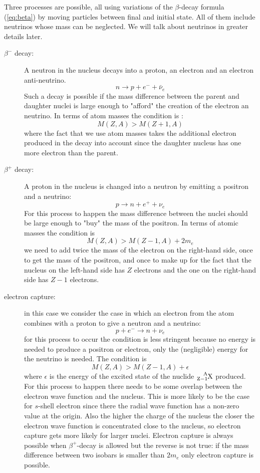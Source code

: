 \documentclass[12pt]{article}
\begin{document}
Three processes are possible, all using variations of the $\beta$-decay formula (\ref{eq:beta}) by moving particles between final and initial state. All of them include neutrinos whose mass can be neglected. We will talk about neutrinos in greater details later.
\begin{description}
\item[$\beta^-$ decay:] A neutron in the nucleus decays into a proton, an  electron and an electron anti-neutrino. 
\[n\rightarrow p+e^-+\bar{\nu}_e\]
Such a decay is possible if the mass difference between the parent and daughter nuclei is large enough to "afford" the creation of the electron an neutrino. In terms of atom masses the condition is :
\[M(Z,A) > M(Z+1,A)\]
where the fact that we use atom masses takes the additional electron produced in the decay into account since the daughter nucleus has one more electron than the parent. 
\item[$\beta^+$ decay:] A proton in the nucleus is changed into a neutron by emitting a positron and a neutrino:
\[p\rightarrow n+e^++\nu_e\]
For this process to happen the mass difference between the nuclei should be large enough to "buy" the mass of the positron. In terms of atomic masses the condition is 
\[M(Z,A) > M(Z-1,A) + 2m_e\] 
we need to add twice the mass of the electron on the right-hand side, once to get the mass of the positron, and once to make up for the fact that the nucleus on the left-hand side has $Z$ electrons and the one on the right-hand side has $Z-1$ electrons. 
\item[electron capture:] in this case we consider the case in which an electron from the atom combines with a proton to give a neutron and a neutrino:
\[p+e^-\rightarrow n+\nu_e\]
for this process to occur the condition is less stringent because no energy is needed to produce a positron or electron, only the (negligible) energy for the neutrino is needed. The condition is 
\[M(Z,A)> M(Z-1,A)+\epsilon\]
where $\epsilon$ is the energy of the excited state of the nuclide $\ce{^{A}_{Z-1}X}$ produced. For this process to happen there needs to be some overlap between the electron wave function and the nucleus. This is more likely to be the case for $s$-shell electron since there the radial wave function has a non-zero value at the origin. Also the higher the charge of the nucleus the closer the electron wave function is concentrated close to the nucleus, so electron capture gets more likely for larger nuclei. Electron capture is always possible when $\beta^+$-decay is allowed but the reverse is not true: if the mass difference between two isobars is smaller than $2m_e$ only electron capture is possible.
\end{description}
\end{document}
